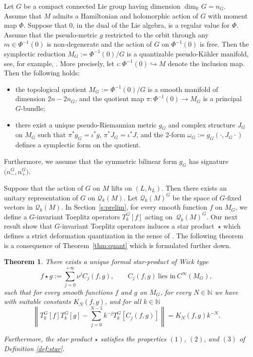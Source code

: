 \documentclass[10pt,a4paper]{amsart}
\numberwithin{equation}{section}
\newtheorem{Theorem}{Theorem}[section]
\begin{document}
Let $G$ be a compact connected Lie group having dimension $\dim_{\mathbb{R}}G=n_G$. Assume that $M$ admits a Hamiltonian and holomorphic action of $G$ with moment map $\Phi$. Suppose that $0$, in the dual of the Lie algebra, is a regular value for $\Phi$. Assume that the pseudo-metric $g$ restricted to the orbit through any $m\in \Phi^{-1}(0)$ is non-degenerate and the action of $G$ on $\Phi^{-1}(0)$ is free. Then the symplectic reduction $M_G:=\Phi^{-1}(0)/G$ is a quantizable pseudo-K\"ahler manifold, see, for example, \cite[Appendix~B]{rungi}. More precisely, let $\iota \colon\Phi^{-1}(0) \hookrightarrow M$ denote the inclusion map. Then the following holds:
	\begin{itemize}\itemsep=0pt
			\item[(1)] the topological quotient $M_G := \Phi^{-1}(0)/G$ is a smooth manifold of dimension $2n - 2n_G$, and the quotient map $\pi \colon \Phi^{-1}(0) \to M_G$ is a principal $G$-bundle;
			\item[(2)] there exist a unique pseudo-Riemannian metric $g_G$ and complex structure $J_G$ on $M_G$ such that
$
			\pi^* g_G = \iota^* g$, $ \pi^* J_G = \iota^* J$,
			and the 2-form $\omega_G := g_G(\cdot, J_G \cdot)$ defines a symplectic form on the quotient.
	\end{itemize}
 Furthermore, we assume that the symmetric bilinear form $g_G$ has signature $\bigl(n_-^G, n_+^G\bigr)$.


	
	 Suppose that the action of $G$ on $M$ lifts on $(L,h_L)$. Then there exists an unitary representation of $G$ on $\mathcal{Q}_k(M)$. Let $\mathcal{Q}_k(M)^G$ be the space of $G$-fixed vectors in $\mathcal{Q}_k(M)$. In Section~\ref{s:prelim}, for every smooth function $f$ on $M_G$, we define a $G$-invariant Toeplitz operators $T^G_k[f]$ acting on~$\mathcal{Q}_k(M)^G$. Our next result show that $G$-invariant Toeplitz operators induces a star product~$\star$ which defines a strict deformation quantization in the sense of \cite[Chapter 2]{l}. The following theorem is a consequence of Theorem~\ref{thm:quant} which is formulated further down.
	

\begin{Theorem} \label{cor}
There exists a unique formal star-product of Wick type
\[f\star g := \sum_{j=0}^{+\infty}\nu^j C_j(f, g) ,\qquad C_j(f, g)\ \text{lies in} \ C^{\infty}(M_G), \]
such that for every smooth functions $f$ and $g$ on $M_G$, for every $N\in \mathbb{N}$ we have with suitable constants $K_N(f, g)$, and for all $k\in \mathbb{N}$
\begin{equation} \label{eq:cond}
\left\lVert T^G_k[f] T^G_k[g]-\sum_{j=0}^{N-1} k^{-j} T^G_k[C_j(f,g)]\right \rVert=K_N(f, g) k^{-N} .
\end{equation}
	 	
Furthermore, the star product $\star$ satisfies the properties $(1)$, $(2)$, and $(3)$ of Definition {\rm\ref{def:star}}.
\end{Theorem}
\end{document}
